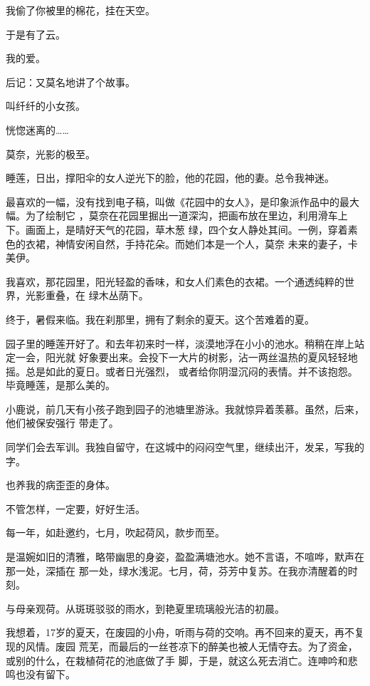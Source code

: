 \documentclass[12pt,a4paper]{article}
\begin{document}
		我偷了你被里的棉花，挂在天空。\par
		于是有了云。\par
		我的爱。\par
		后记：又莫名地讲了个故事。\par
		叫纤纤的小女孩。\par
		恍惚迷离的……

	\endwriting



		莫奈，光影的极至。\par
		睡莲，日出，撑阳伞的女人逆光下的脸，他的花园，他的妻。总令我神迷。

		最喜欢的一幅，没有找到电子稿，叫做《花园中的女人》，是印象派作品中的最大幅。为了绘制它
	，莫奈在花园里掘出一道深沟，把画布放在里边，利用滑车上下。画面上，是晴好天气的花园，草木葱
	绿，四个女人静处其间。一例，穿着素色的衣裙，神情安闲自然，手持花朵。而她们本是一个人，莫奈
	未来的妻子，卡美伊。

		我喜欢，那花园里，阳光轻盈的香味，和女人们素色的衣裙。一个通透纯粹的世界，光影重叠，在
	绿木丛荫下。

		终于，暑假来临。我在刹那里，拥有了剩余的夏天。这个苦难着的夏。

		园子里的睡莲开好了。和去年初来时一样，淡漠地浮在小小的池水。稍稍在岸上站定一会，阳光就
	好象要出来。会投下一大片的树影，沾一两丝温热的夏风轻轻地摇。总是如此的夏日。或者日光强烈，
	或者给你阴湿沉闷的表情。并不该抱怨。毕竟睡莲，是那么美的。

		小鹿说，前几天有小孩子跑到园子的池塘里游泳。我就惊异着羡慕。虽然，后来，他们被保安强行
	带走了。

		同学们会去军训。我独自留守，在这城中的闷闷空气里，继续出汗，发呆，写我的字。\par
		也养我的病歪歪的身体。\par
		不管怎样，一定要，好好生活。

	\endwriting



		每一年，如赴邀约，七月，吹起荷风，款步而至。

		是温婉如旧的清雅，略带幽思的身姿，盈盈满塘池水。她不言语，不喧哗，默声在那一处，深插在
	那一处，绿水浅泥。七月，荷，芬芳中复苏。在我亦清醒着的时刻。

		与母亲观荷。从斑斑驳驳的雨水，到艳夏里琉璃般光洁的初晨。

		我想着，17岁的夏天，在废园的小舟，听雨与荷的交响。再不回来的夏天，再不复现的风情。废园
	荒芜，而最后的一丝苍凉下的醉美也被人无情夺去。为了资金，或别的什么，在栽植荷花的池底做了手
	脚，于是，就这么死去消亡。连呻吟和悲鸣也没有留下。
\end{document}
